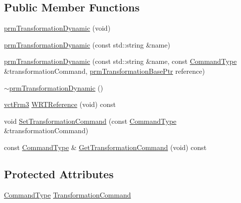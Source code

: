 \subsection*{Public Member Functions}
\begin{DoxyCompactItemize}
\item 
\hyperlink{classprm_transformation_dynamic_aefde621ffa116e694842a9eccfadc227}{prm\-Transformation\-Dynamic} (void)
\item 
\hyperlink{classprm_transformation_dynamic_a40477c627d81e17067d27ec4aeb9fffe}{prm\-Transformation\-Dynamic} (const std\-::string \&name)
\item 
\hyperlink{classprm_transformation_dynamic_a1b887213a2c3679c53155c848a920b6c}{prm\-Transformation\-Dynamic} (const std\-::string \&name, const \hyperlink{classprm_transformation_dynamic_a08d4a3817f09c309060cbd5a70c6cfb9}{Command\-Type} \&transformation\-Command, \hyperlink{prm_transformation_base_8h_a881a6a7d2191474974cdf36d79e1df08}{prm\-Transformation\-Base\-Ptr} reference)
\item 
\hyperlink{classprm_transformation_dynamic_a373b9f14737587687dd3df69818b4816}{$\sim$prm\-Transformation\-Dynamic} ()
\item 
\hyperlink{vct_transformation_types_8h_a81feda0a02c2d1bc26e5553f409fed20}{vct\-Frm3} \hyperlink{classprm_transformation_dynamic_ac2faf487f580a9d5c757bb61243b4e7c}{W\-R\-T\-Reference} (void) const 
\end{DoxyCompactItemize}
{\bf }\par
\begin{DoxyCompactItemize}
\item 
void \hyperlink{classprm_transformation_dynamic_a31d600dddb3cb2f83bfd0579e376dc75}{Set\-Transformation\-Command} (const \hyperlink{classprm_transformation_dynamic_a08d4a3817f09c309060cbd5a70c6cfb9}{Command\-Type} \&transformation\-Command)
\item 
const \hyperlink{classprm_transformation_dynamic_a08d4a3817f09c309060cbd5a70c6cfb9}{Command\-Type} \& \hyperlink{classprm_transformation_dynamic_a0a6054a2011d559cf6b1fc5b8260a712}{Get\-Transformation\-Command} (void) const 
\end{DoxyCompactItemize}

\subsection*{Protected Attributes}
\begin{DoxyCompactItemize}
\item 
\hyperlink{classprm_transformation_dynamic_a08d4a3817f09c309060cbd5a70c6cfb9}{Command\-Type} \hyperlink{classprm_transformation_dynamic_a09131f273e7dd6388d357b6830ff5069}{Transformation\-Command}
\end{DoxyCompactItemize}
